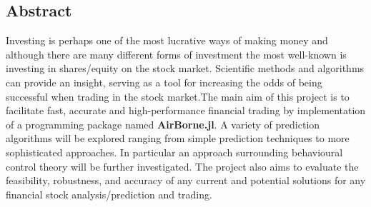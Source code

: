 \begin{center}
\section*{Abstract}
\end{center}

 \noindent Investing is perhaps one of the most lucrative ways of making money and although there are many different forms of investment the most well-known is investing in shares/equity on the stock market. Scientific methods and algorithms can provide an insight, serving as a tool for increasing the odds of being successful when trading in the stock market.The main aim of this project is to  facilitate fast, accurate and high-performance financial trading by implementation of a programming package named \textbf{AirBorne.jl}. A variety of prediction algorithms will be explored ranging from simple prediction techniques to more sophisticated approaches. In particular an approach surrounding behavioural control theory will be further investigated. The project also aims to evaluate the feasibility, robustness, and accuracy of any current and potential solutions for any financial stock analysis/prediction and trading.